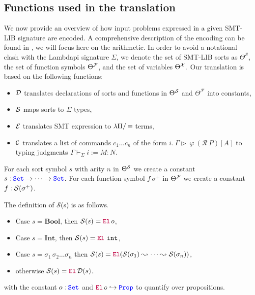 \subsection{Functions used in the translation}

We now provide an overview of how input problems expressed in a given SMT-LIB signature \cite[\S 5.2.1]{smtlib} are encoded.
A comprehensive description of the encoding can be found in \cite{ColtellacciMD24}, we will focus here on the arithmetic.
In order to avoid a notational clash with the Lambdapi signature $\Sigma$, we denote the set of SMT-LIB sorts as $\Theta^\mathcal{S}$, the set of function symbols $\Theta^\cal{F}$, and the set of variables $\Theta^\cal{X}$.
Our translation is based on the following functions:

\begin{itemize}
\item $\cal{D}$ translates declarations of sorts and functions in $\Theta^\cal{S}$ and $\Theta^\mathcal{F}$ into constants,
\item $\cal{S}$ maps sorts to $\Sigma$ types,
\item $\cal{E}$ translates SMT expression to $\lpm$ terms,
\item $\cal{C}$ translates a list of commands  $c_1 \dots c_n$ of the form $i.~\Gamma \triangleright~\varphi~(\mathcal{R}~P)[A]$ to typing judgments $\Gamma \vdash_\Sigma i := M: N$.
\end{itemize}

\begin{definition}
For each sort symbol $s$ with arity $n$ in $\Theta^\cal{S}$ we create a constant $s: \set \ra \dots \ra \set$.
For each function symbol $f~\sigma^+$ in $\Theta^\cal{F}$ we create a constant $f: \cal{S}(\sigma^+)$.
\end{definition}

\begin{definition} 
  The definition of $\mathcal{S}$(s) is as follows.
  \begin{itemize}
    \item Case $s = \textbf{Bool}$, then $\Sort{s} = \el\,o$,
    \item Case $s = \textbf{Int}$, then $\Sort{s} = \el~\texttt{int}$,
    \item Case $s = \sigma_1\,\sigma_2 \dots \sigma_n$ then $\Sort{s} = \el{} (\mathcal{S}(\sigma_1) \leadsto \dots \leadsto \mathcal{S}(\sigma_n))$,
    \item otherwise $\Sort{s} = \el\, \mathcal{D}(s)$.
  \end{itemize}
  with the constant $o: \set$ and $\el\, o \re \prop$ to quantify over propositions.
\end{definition}

